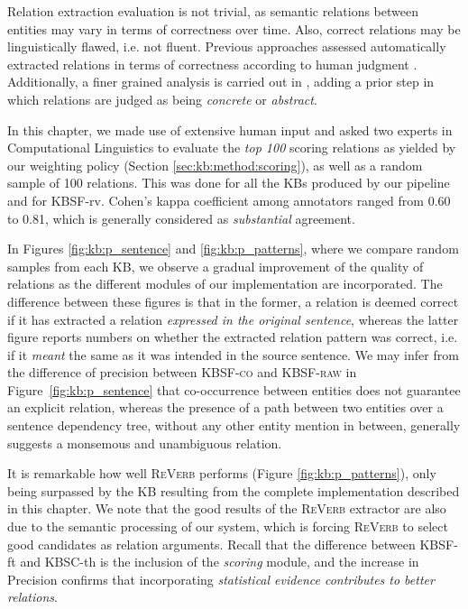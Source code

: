 Relation extraction evaluation is not trivial, as semantic relations between entities may vary in terms of correctness over time. Also, correct relations may be linguistically flawed, i.e. not fluent. Previous approaches assessed automatically extracted relations in terms of correctness according to human judgment \citep{Fader2011,Mausam2012}. Additionally, a finer grained analysis is carried out in \cite{Bankoetal2007}, adding a prior step in which relations are judged as being \textit{concrete} or \textit{abstract}.

In this chapter, we made use of extensive human input and asked two experts in Computational Linguistics to evaluate the \textit{top 100} scoring relations as yielded by our weighting policy (Section \ref{sec:kb:method:scoring}), as well as a random sample of 100 relations. This was done for all the KBs produced by our pipeline and for \textsc{KBSF}-rv. Cohen's kappa coefficient among annotators ranged from 0.60 to 0.81, which is generally considered as \textit{substantial} agreement.


In Figures \ref{fig:kb:p_sentence} and \ref{fig:kb:p_patterns}, where we compare random samples from each KB, we observe a gradual improvement of the quality of relations as the different modules of our implementation are incorporated. The difference between these figures is that in the former, a relation is deemed correct if it has extracted a relation \textit{expressed in the original sentence}, whereas the latter figure reports numbers on whether the extracted relation pattern was correct, i.e. if it \textit{meant} the same as it was intended in the source sentence. We may infer from the difference of precision between \textsc{KBSF-co} and \textsc{KBSF-raw} in Figure~\ref{fig:kb:p_sentence} that co-occurrence between entities does not guarantee an explicit relation, whereas the presence of a path between two entities over a sentence dependency tree, without any other entity mention in between, generally suggests a monsemous and unambiguous relation.

It is remarkable how well \textsc{ReVerb} performs (Figure \ref{fig:kb:p_patterns}), only being surpassed by the KB resulting from the complete implementation described in this chapter. We note that the good results of the \textsc{ReVerb} extractor are also due to the semantic processing of our system, which is forcing \textsc{ReVerb} to select good candidates as relation arguments. Recall that the difference between \textsc{KBSF}-ft and \textsc{KBSC}-th is the inclusion of the \textit{scoring} module, and the increase in Precision confirms that incorporating \textit{statistical evidence contributes to better relations}.

